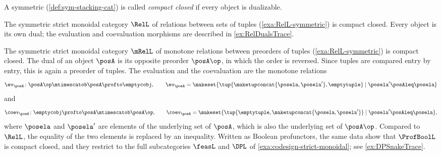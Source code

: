\begin{ctdefinition}
    \label{def:compact-closed-category}
    A symmetric  (\cref{def:sym-stacking-cat}) is called \emph{compact closed} if every object is dualizable.
\end{ctdefinition}


\begin{example}
    The symmetric strict monoidal category $\RelL$ of relations between sets of tuples (\cref{exa:RelL-symmetric}) is compact closed.
    Every object is its own dual; the evaluation and coevaluation morphisms are described in \cref{ex:RelDualsTrace}.
\end{example}

\begin{example}
    \label{exa:mRelL-compact-closed}
    The symmetric strict monoidal category $\mRelL$ of monotone relations between preorders of tuples (\cref{exa:RelL-symmetric}) is compact closed.
    The dual of an object $\posA$ is its opposite preorder $\posA\op$, in which the order is reversed.
    Since tuples are compared entry by entry, this is again a preorder of tuples.
    The evaluation and the coevaluation are the monotone relations
    \begin{equation}
        \label{eq:mRelL-ev}
        \ev_{\posA} \colon \posA\op \mtimescatob \posA \profto \emptycobj,
        \qquad
        \ev_{\posA} = \makeset{ \tup{\maketupconcat{\posela, \posela'}, \emptytuple} \mid \posela' \posAleq \posela }
    \end{equation}
    and
    \begin{equation}
        \label{eq:mRelL-coev}
        \coev_{\posA} \colon \emptycobj \profto \posA \mtimescatob \posA\op,
        \qquad
        \coev_{\posA} = \makeset{ \tup{\emptytuple, \maketupconcat{\posela, \posela'}} \mid \posela' \posAleq \posela },
    \end{equation}
    where $\posela$ and $\posela'$ are elements of the underlying set of $\posA$, which is also the underlying set of $\posA\op$.
    Compared to $\RelL$, the equality of the two elements is replaced by an inequality.
    Written as Boolean profunctors, the same data show that $\ProfBoolL$ is compact closed, and they restrict to the full subcategories $\feasL$ and $\DPL$ of \cref{exa:codesign-strict-monoidal}; see \cref{ex:DPSnakeTrace}.
\end{example}

